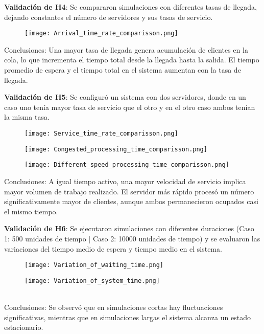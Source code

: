 \documentclass[12pt,a4paper]{article}
\begin{document}
\textbf{Validación de H4}: Se compararon simulaciones con diferentes tasas de llegada, dejando constantes el número de servidores y 
sus tasas de servicio.\\
\begin{figure}[!!h]
    \centering
    \texttt{[image: Arrival\_time\_rate\_comparisson.png]}
\end{figure}
Conclusiones: Una mayor tasa de llegada genera acumulación de clientes en la cola, lo que incrementa el tiempo total desde la
llegada hasta la salida. El tiempo promedio de espera y el tiempo total en el sistema aumentan con la tasa de llegada.\\\vspace{1cm}

\textbf{Validación de H5}: Se configuró un sistema con dos servidores, donde en un caso uno tenía mayor tasa de servicio que el otro y en el otro caso ambos tenían la misma tasa.\\
\begin{figure}[!!h]
    \centering
    \texttt{[image: Service\_time\_rate\_comparisson.png]}
\end{figure}
\begin{figure}[!!h]
    \centering
    \texttt{[image: Congested\_processing\_time\_comparisson.png]}
\end{figure}
\begin{figure}[!!h]
    \centering
    \texttt{[image: Different\_speed\_processing\_time\_comparisson.png]}
\end{figure}
\newpage
Conclusiones: A igual tiempo activo, una mayor velocidad de servicio implica mayor volumen de trabajo realizado. El servidor más
rápido procesó un número significativamente mayor de clientes, aunque ambos permanecieron ocupados casi el mismo tiempo.\\\vspace{1cm}

\textbf{Validación de H6}: Se ejecutaron simulaciones con diferentes duraciones (Caso 1: 500 unidades de tiempo | Caso 2: 10000 unidades de tiempo) y se evaluaron las variaciones del tiempo medio de espera y tiempo medio en el sistema.\\
\begin{figure}[!!h]
    \centering
    \texttt{[image: Variation\_of\_waiting\_time.png]}
\end{figure}
\begin{figure}[!!h]
    \centering
    \texttt{[image: Variation\_of\_system\_time.png]}
\end{figure}
\\Conclusiones: Se observó que en simulaciones cortas hay fluctuaciones significativas, mientras que en simulaciones largas el 
sistema alcanza un estado estacionario.\\\vspace{1cm}
\end{document}
